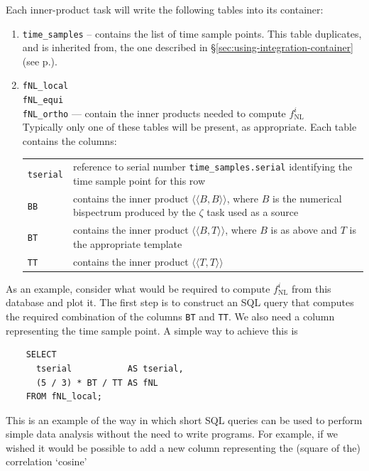 \documentclass[11pt,a4paper]{article}
\newcommand{\fNL}{f_{\mathrm{NL}}}
\newcommand{\iprod}[2]{\langle\!\langle {#1}, {#2} \rangle\!\rangle}
\newenvironment{sqltablelist}{\renewcommand{\arraystretch}{1.3}\small}{}
\begin{document}
Each inner-product task will write the following tables
into its container:
\begin{sqltablelist}
\begin{enumerate}
    \item \texttt{time_samples} -- contains the list of time sample points.
	This table duplicates, and is inherited from, the one described in \S\ref{sec:using-integration-container}
	(see p.\pageref{sqltable:time-samples}).
	
	\item \texttt{fNL_local} \\
	\texttt{fNL_equi} \\
	\texttt{fNL_ortho} --- contain the inner products needed to compute $\fNL^i$ \\
	Typically only one of these tables will be present, as appropriate. Each table contains the columns: \\
	\begin{tabular}{p{2.5cm}p{11.5cm}}
	   \texttt{tserial} & reference to serial number \texttt{time_samples.serial}
	   identifying the time sample point for this row \\
	   \texttt{BB} & contains the inner product $\iprod{B}{B}$, where $B$ is the numerical
	   bispectrum produced by the $\zeta$ task used as a source \\
	   \texttt{BT} & contains the inner product $\iprod{B}{T}$, where $B$ is as above and
	   $T$ is the appropriate template \\
	   \texttt{TT} & contains the inner product $\iprod{T}{T}$ 
	\end{tabular}
\end{enumerate}
\end{sqltablelist}
As an example, consider what would be required to compute
$\fNL^i$ from this database and plot it.
The first step is to construct an SQL query that computes the
required combination
of the columns \texttt{BT}
and \texttt{TT}.
We also need a column representing the time sample point.
A simple way to achieve this is
\begin{verbatim}
    SELECT
      tserial           AS tserial,
      (5 / 3) * BT / TT AS fNL
    FROM fNL_local;
\end{verbatim}
This is an example of the way in which short SQL queries can be used
to perform simple data analysis without
the need to write programs.
For example, if we wished it would be possible to add
a new column representing the (square of the) correlation `cosine'
\end{document}
